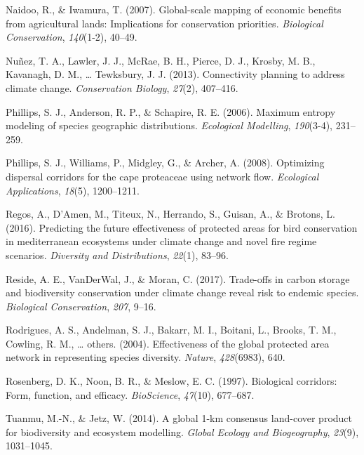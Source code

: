 \documentclass[]{article}
\begin{document}
\leavevmode\hypertarget{ref-naidoo2007global}{}%
Naidoo, R., \& Iwamura, T. (2007). Global-scale mapping of economic benefits from agricultural lands: Implications for conservation priorities. \emph{Biological Conservation}, \emph{140}(1-2), 40--49.

\leavevmode\hypertarget{ref-nunez2013connectivity}{}%
Nuñez, T. A., Lawler, J. J., McRae, B. H., Pierce, D. J., Krosby, M. B., Kavanagh, D. M., \ldots{} Tewksbury, J. J. (2013). Connectivity planning to address climate change. \emph{Conservation Biology}, \emph{27}(2), 407--416.

\leavevmode\hypertarget{ref-phillips2006maximum}{}%
Phillips, S. J., Anderson, R. P., \& Schapire, R. E. (2006). Maximum entropy modeling of species geographic distributions. \emph{Ecological Modelling}, \emph{190}(3-4), 231--259.

\leavevmode\hypertarget{ref-phillips2008optimizing}{}%
Phillips, S. J., Williams, P., Midgley, G., \& Archer, A. (2008). Optimizing dispersal corridors for the cape proteaceae using network flow. \emph{Ecological Applications}, \emph{18}(5), 1200--1211.

\leavevmode\hypertarget{ref-regos2016predicting}{}%
Regos, A., D'Amen, M., Titeux, N., Herrando, S., Guisan, A., \& Brotons, L. (2016). Predicting the future effectiveness of protected areas for bird conservation in mediterranean ecosystems under climate change and novel fire regime scenarios. \emph{Diversity and Distributions}, \emph{22}(1), 83--96.

\leavevmode\hypertarget{ref-reside2017trade}{}%
Reside, A. E., VanDerWal, J., \& Moran, C. (2017). Trade-offs in carbon storage and biodiversity conservation under climate change reveal risk to endemic species. \emph{Biological Conservation}, \emph{207}, 9--16.

\leavevmode\hypertarget{ref-rodrigues2004effectiveness}{}%
Rodrigues, A. S., Andelman, S. J., Bakarr, M. I., Boitani, L., Brooks, T. M., Cowling, R. M., \ldots{} others. (2004). Effectiveness of the global protected area network in representing species diversity. \emph{Nature}, \emph{428}(6983), 640.

\leavevmode\hypertarget{ref-rosenberg1997biological}{}%
Rosenberg, D. K., Noon, B. R., \& Meslow, E. C. (1997). Biological corridors: Form, function, and efficacy. \emph{BioScience}, \emph{47}(10), 677--687.

\leavevmode\hypertarget{ref-tuanmu2014global}{}%
Tuanmu, M.-N., \& Jetz, W. (2014). A global 1-km consensus land-cover product for biodiversity and ecosystem modelling. \emph{Global Ecology and Biogeography}, \emph{23}(9), 1031--1045.
\end{document}
